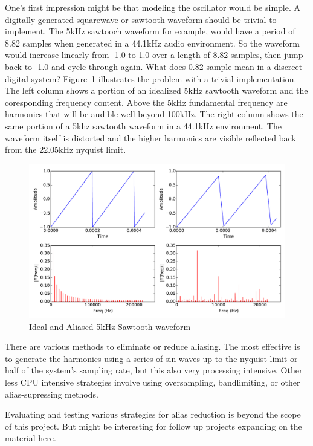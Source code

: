 One's first impression might be that modeling the oscillator would be simple. A digitally generated squarewave or sawtooth waveform should be trivial to implement. The 5kHz sawtooch waveform for example, would have a period of 8.82 samples when generated in a 44.1kHz audio environment. So the waveform would increase linearly from -1.0 to 1.0 over a length of 8.82 samples, then jump back to -1.0 and cycle through again. What does 0.82 sample mean in a discreet digital system? Figure~\ref{fig:aliasing_sawtooth} illustrates the problem with a trivial implementation. The left column shows a portion of an idealized 5kHz sawtooth waveform and the coresponding frequency content. Above the 5kHz fundamental frequency are harmonics that will be audible well beyond 100kHz. The right column shows the same portion of a 5khz sawtooth waveform in a 44.1kHz environment. The waveform itself is distorted and the higher harmonics are visible reflected back from the 22.05kHz nyquist limit.

\begin{figure}[H]
    \centering
    \includegraphics[width=\textwidth]{plots/graphics/sawtooth.pdf}
    \caption{Ideal and Aliased 5kHz Sawtooth waveform}
    \label{fig:aliasing_sawtooth}
\end{figure}

There are various methods to eliminate or reduce aliasing. The most effective is to generate the harmonics using a series of sin waves up to the nyquist limit or half of the system's sampling rate, but this also very processing intensive. Other less CPU intensive strategies involve using oversampling, bandlimiting, or other alias-supressing methods\cite{virtual_analog_synthesis}.

Evaluating and testing various strategies for alias reduction is beyond the scope of this project. But might be
interesting for follow up projects expanding on the material here.


